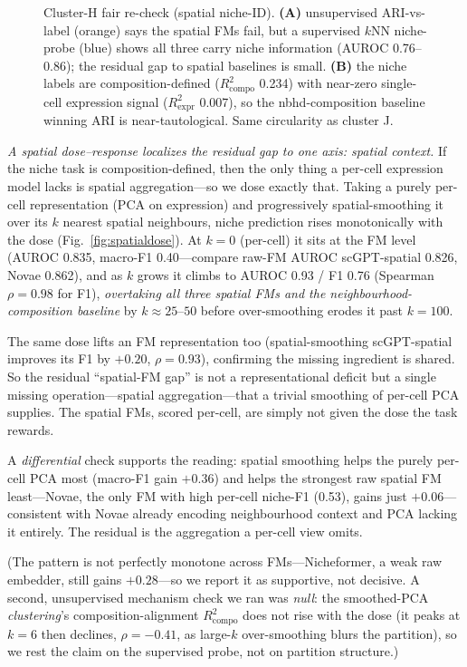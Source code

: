 \documentclass[fleqn,10pt,lineno]{wlpeerj}  %
\newcommand{\fitfig}[1]{\resizebox{\ifdim\width>\linewidth\linewidth\else\width\fi}{!}{#1}}
\begin{document}
\begin{figure}[htb]\centering\fitfig{}
\caption{Cluster-H fair re-check (spatial niche-ID). \textbf{(A)} unsupervised ARI-vs-label (orange) says the spatial FMs fail, but a supervised $k$NN niche-probe (blue) shows all three carry niche information (AUROC 0.76--0.86); the residual gap to spatial baselines is small. \textbf{(B)} the niche labels are composition-defined ($R^2_{\mathrm{compo}}$ 0.234) with near-zero single-cell expression signal ($R^2_{\mathrm{expr}}$ 0.007), so the nbhd-composition baseline winning ARI is near-tautological. Same circularity as cluster J.}\label{fig:spfair}\end{figure}

\emph{A spatial dose--response localizes the residual gap to one axis: spatial context.} If the niche task is composition-defined, then the only thing a per-cell expression model lacks is spatial aggregation---so we dose exactly that. Taking a purely per-cell representation (PCA on expression) and progressively spatial-smoothing it over its $k$ nearest spatial neighbours, niche prediction rises monotonically with the dose (Fig.~\ref{fig:spatialdose}). At $k{=}0$ (per-cell) it sits at the FM level (AUROC 0.835, macro-F1 0.40---compare raw-FM AUROC scGPT-spatial 0.826, Novae 0.862), and as $k$ grows it climbs to AUROC 0.93 / F1 0.76 (Spearman $\rho=0.98$ for F1), \emph{overtaking all three spatial FMs and the neighbourhood-composition baseline} by $k\approx25$--$50$ before over-smoothing erodes it past $k{=}100$.

The same dose lifts an FM representation too (spatial-smoothing scGPT-spatial improves its F1 by $+0.20$, $\rho=0.93$), confirming the missing ingredient is shared. So the residual ``spatial-FM gap'' is not a representational deficit but a single missing operation---spatial aggregation---that a trivial smoothing of per-cell PCA supplies. The spatial FMs, scored per-cell, are simply not given the dose the task rewards.

A \emph{differential} check supports the reading: spatial smoothing helps the purely per-cell PCA most (macro-F1 gain $+0.36$) and helps the strongest raw spatial FM least---Novae, the only FM with high per-cell niche-F1 (0.53), gains just $+0.06$---consistent with Novae already encoding neighbourhood context and PCA lacking it entirely. The residual is the aggregation a per-cell view omits.

(The pattern is not perfectly monotone across FMs---Nicheformer, a weak raw embedder, still gains $+0.28$---so we report it as supportive, not decisive. A second, unsupervised mechanism check we ran was \emph{null}: the smoothed-PCA \emph{clustering}'s composition-alignment $R^2_{\mathrm{compo}}$ does not rise with the dose (it peaks at $k{=}6$ then declines, $\rho=-0.41$, as large-$k$ over-smoothing blurs the partition), so we rest the claim on the supervised probe, not on partition structure.)
\end{document}
